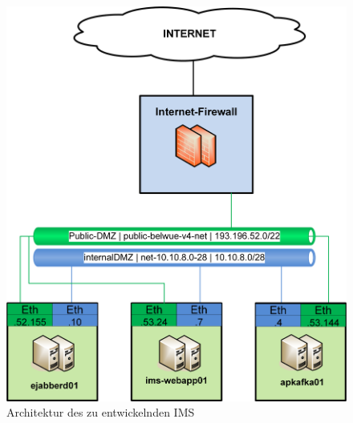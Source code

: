 \documentclass[a4paper,titlepage,halfparskip,12pt]{scrreprt}
\begin{document}
\begin{figure}[h]
	\centering
	\includegraphics[width=.95\linewidth]{images/Studienarbeit-Netzwerkplan}
	\caption{Architektur des zu entwickelnden \ac{IMS}}
	\label{img:ArchitekturIMS}
\end{figure}
\end{document}
